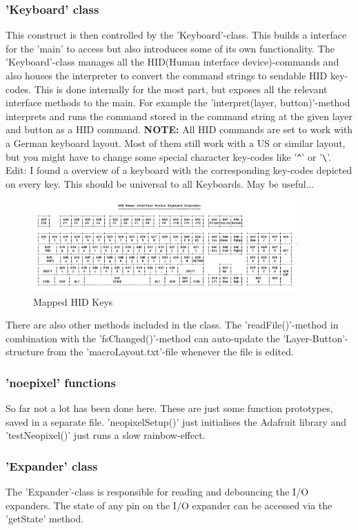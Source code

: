 \documentclass[english, 12pt]{scrartcl}
\begin{document}
	\subsubsection{'Keyboard' class}
	This construct is then controlled by the 'Keyboard'-class. This builds a interface for the 'main' to access but also introduces some of its own functionality. The 'Keyboard'-class manages all the HID(Human interface device)-commands and also houses the interpreter to convert the command strings to sendable HID key-codes. This is done internally for the most part, but exposes all the relevant interface methods to the main. For example the 'interpret(layer, button)'-method interprets and runs the command stored in the command string at the given layer and button as a HID command.\newline
	\textbf{NOTE:} All HID commands are set to work with a German keyboard layout. Most of them still work with a US or similar layout, but you might have to change some special character key-codes like '\verb=^=' or '\verb=\='.\newline
	Edit: I found a overview of a keyboard with the corresponding key-codes depicted on every key. This should be universal to all Keyboards. May be useful...
	\begin{figure}[H]
		\centering
		\includegraphics[width=0.9\textwidth]{HIDkeys}
		\caption{Mapped HID Keys}
	\end{figure}
	
	\noindent There are also other methods included in the class. The 'readFile()'-method in combination with the 'fsChanged()'-method can auto-update the 'Layer-Button'-structure from the 'macroLayout.txt'-file whenever the file is edited.
	\subsubsection{'noepixel' functions}
	So far not a lot has been done here. These are just some function prototypes, saved in a separate file. 'neopixelSetup()' just initialises the Adafruit library and 'testNeopixel()' just runs a slow rainbow-effect.
	\subsubsection{'Expander' class}
	The 'Expander'-class is responsible for reading and debouncing the I/O expanders. The state of any pin on the I/O expander can be accessed via the 'getState' method.
\end{document}
